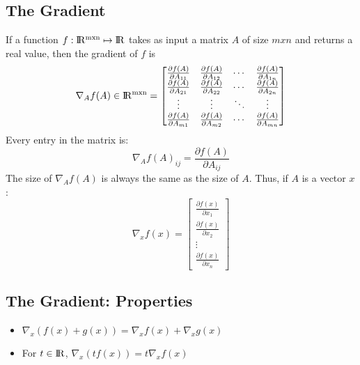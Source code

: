 \documentclass{article}
\begin{document}
\subsection{The Gradient}
If a function $f:{\rm I\!R^{mxn}} \mapsto {\rm I\!R}$ takes as input a matrix $A$ of size $mxn$ and returns a real value, then the gradient of $f$ is
\newline
$$\nabla_A f(A) \in {\rm I\!R^{mxn}} = \begin{bmatrix}
    \frac{\partial f(A)}{\partial A_{11}} & \frac{\partial f(A)}{\partial A_{12}} & \cdots & \frac{\partial f(A)}{\partial A_{1n}} \\
    \frac{\partial f(A)}{\partial A_{21}} & \frac{\partial f(A)}{\partial A_{22}} & \cdots & \frac{\partial f(A)}{\partial A_{2n}} \\
    \vdots & \vdots & \ddots & \vdots \\
    \frac{\partial f(A)}{\partial A_{m1}} & \frac{\partial f(A)}{\partial A_{m2}} & \cdots & \frac{\partial f(A)}{\partial A_{mn}}
\end{bmatrix}
$$
\newline
Every entry in the matrix is: $$\nabla_A f(A)_{ij} = \frac{\partial f(A)}{\partial A_{ij}}$$
\newline
The size of $\nabla_A f(A)$ is always the same as the size of $A$. Thus, if $A$ is a vector $x$:
$$\nabla_x f(x) = \begin{bmatrix}
	\frac{\partial f(x)}{\partial x_{1}} \\
    \frac{\partial f(x)}{\partial x_{2}} \\
    \vdots \\
    \frac{\partial f(x)}{\partial x_{n}} 
\end{bmatrix}
$$
\subsection{The Gradient: Properties}
\begin{itemize}
\item $\nabla_x (f(x) + g(x)) = \nabla_x f(x) + \nabla_x g(x)$
\item For $t \in {\rm I\!R}$, $\nabla_x (t f(x)) = t \nabla_x f(x)$
\end{itemize}
\end{document}
